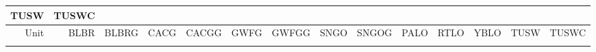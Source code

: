 \documentclass[]{article}
\begin{document}
\begin{longtable}[]{@{}rrrrrrrrrrrrrr@{}}
\begin{minipage}[b]{0.04\columnwidth}
TUSW\strut
\end{minipage} & \begin{minipage}[b]{0.04\columnwidth}\raggedleft\strut
TUSWC\strut
\end{minipage}\tabularnewline
\midrule
\endfirsthead
\toprule
\begin{minipage}[b]{0.05\columnwidth}\raggedleft\strut
Unit\strut
\end{minipage} & \begin{minipage}[b]{0.04\columnwidth}\raggedleft\strut
BLBR\strut
\end{minipage} & \begin{minipage}[b]{0.05\columnwidth}\raggedleft\strut
BLBRG\strut
\end{minipage} & \begin{minipage}[b]{0.04\columnwidth}\raggedleft\strut
CACG\strut
\end{minipage} & \begin{minipage}[b]{0.05\columnwidth}\raggedleft\strut
CACGG\strut
\end{minipage} & \begin{minipage}[b]{0.05\columnwidth}\raggedleft\strut
GWFG\strut
\end{minipage} & \begin{minipage}[b]{0.05\columnwidth}\raggedleft\strut
GWFGG\strut
\end{minipage} & \begin{minipage}[b]{0.04\columnwidth}\raggedleft\strut
SNGO\strut
\end{minipage} & \begin{minipage}[b]{0.05\columnwidth}\raggedleft\strut
SNGOG\strut
\end{minipage} & \begin{minipage}[b]{0.04\columnwidth}\raggedleft\strut
PALO\strut
\end{minipage} & \begin{minipage}[b]{0.04\columnwidth}\raggedleft\strut
RTLO\strut
\end{minipage} & \begin{minipage}[b]{0.04\columnwidth}\raggedleft\strut
YBLO\strut
\end{minipage} & \begin{minipage}[b]{0.04\columnwidth}\raggedleft\strut
TUSW\strut
\end{minipage} & \begin{minipage}[b]{0.04\columnwidth}\raggedleft\strut
TUSWC\strut
\end{minipage}\tabularnewline
\midrule
\endhead
\begin{minipage}[t]{0.05\columnwidth}\raggedleft\strut

\end{minipage}
\end{longtable}
\end{document}
